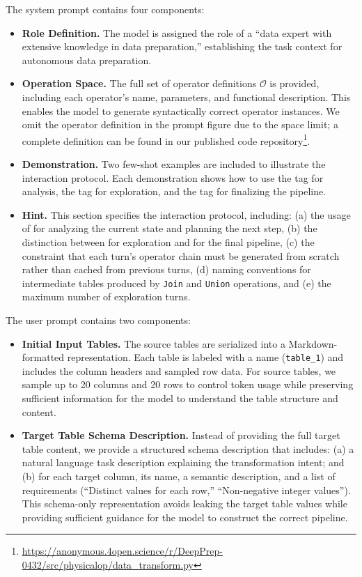 The system prompt contains four components:
\begin{itemize}[leftmargin=*]
    \item \textbf{Role Definition.} The model is assigned the role of a ``data expert with extensive knowledge in data preparation,'' establishing the task context for autonomous data preparation.
    \item \textbf{Operation Space.} The full set of operator definitions $\mathcal{O}$ is provided, including each operator's name, parameters, and functional description. This enables the model to generate syntactically correct operator instances. We omit the operator definition in the prompt figure due to the space limit; a complete definition can be found in our published code repository\footnote{\url{https://anonymous.4open.science/r/DeepPrep-0432/src/physicalop/data_transform.py}}.
    \item \textbf{Demonstration.} Two few-shot examples are included to illustrate the interaction protocol. Each demonstration shows how to use the  tag for analysis, the  tag for exploration, and the  tag for finalizing the pipeline.
    \item \textbf{Hint.} This section specifies the interaction protocol, including: (a) the usage of  for analyzing the current state and planning the next step, (b) the distinction between  for exploration and  for the final pipeline, (c) the constraint that each turn's operator chain must be generated from scratch rather than cached from previous turns, (d) naming conventions for intermediate tables produced by \texttt{Join} and \texttt{Union} operations, and (e) the maximum number of exploration turns.
\end{itemize}

The user prompt contains two components:
\begin{itemize}[leftmargin=*]
    \item \textbf{Initial Input Tables.} The source tables are serialized into a Markdown-formatted representation. Each table is labeled with a name (\eg \texttt{table\_1}) and includes the column headers and sampled row data. For source tables, we sample up to 20 columns and 20 rows to control token usage while preserving sufficient information for the model to understand the table structure and content.
    \item \textbf{Target Table Schema Description.} Instead of providing the full target table content, we provide a structured schema description that includes: (a) a natural language task description explaining the transformation intent; and (b) for each target column, its name, a semantic description, and a list of requirements (\eg ``Distinct values for each row,'' ``Non-negative integer values''). This schema-only representation avoids leaking the target table values while providing sufficient guidance for the model to construct the correct pipeline.
\end{itemize}


